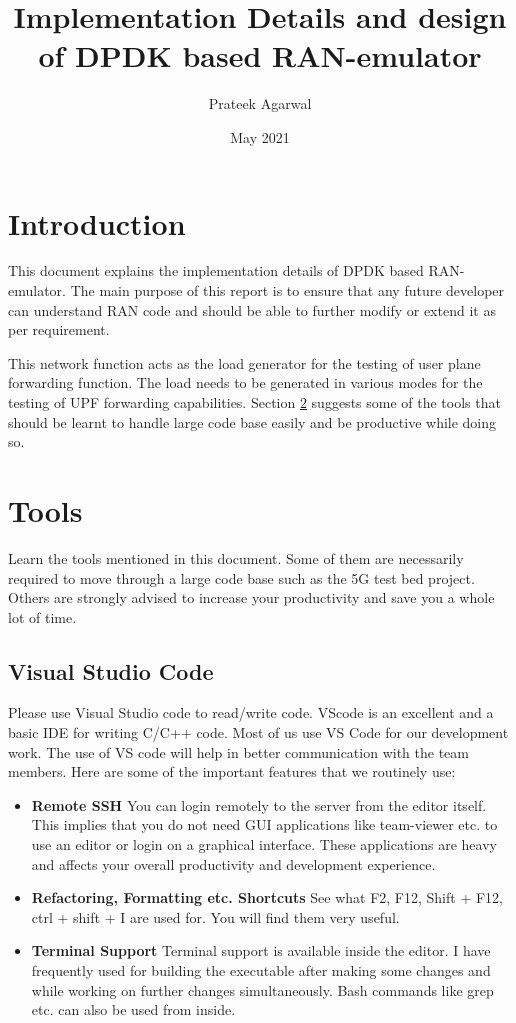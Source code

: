 \documentclass{article}
\title{Implementation Details and design of DPDK based RAN-emulator}
\author{Prateek Agarwal}
\date{May 2021}
\begin{document}
\maketitle
\tableofcontents

\section{Introduction} \label{Intro}
This document explains the implementation details of DPDK based RAN-emulator. The main purpose of this report is to ensure that any future developer can understand RAN code and should be able to further modify or extend it as per requirement.

This network function acts as the load generator for the testing of user plane forwarding function.
The load needs to be generated in various modes for the testing of UPF forwarding capabilities.
Section \ref{tools} suggests some of the tools that should be learnt to handle large code base easily and be productive while doing so.

\section{Tools} \label{tools}
Learn the tools mentioned in this document.
Some of them are necessarily required to move through a large code base such as the 5G test bed project. Others are strongly advised to increase your productivity and save you a whole lot of time.
\subsection{Visual Studio Code}
Please use Visual Studio code to read/write code. VScode is an excellent and a  basic IDE for writing C/C++ code. Most of us use VS Code for our development work. The use of VS code will help in better communication with the team members. Here are some of the important features that we routinely use:
\begin{itemize}
    \item \textbf{Remote SSH} You can login remotely to the server from the editor itself. This implies that you do not need GUI applications like team-viewer etc. to use an editor or login on a graphical interface. These applications are heavy and affects your overall productivity and development experience.
    \item \textbf{Refactoring, Formatting etc. Shortcuts} See what F2, F12, Shift + F12, ctrl + shift + I are used for. You will find them very useful.
    \item \textbf{Terminal Support} Terminal support is available inside the editor. I have frequently used for building the executable after making some changes and while working on further changes simultaneously. Bash commands like grep etc. can also be used from inside.
\end{itemize}
\end{document}
